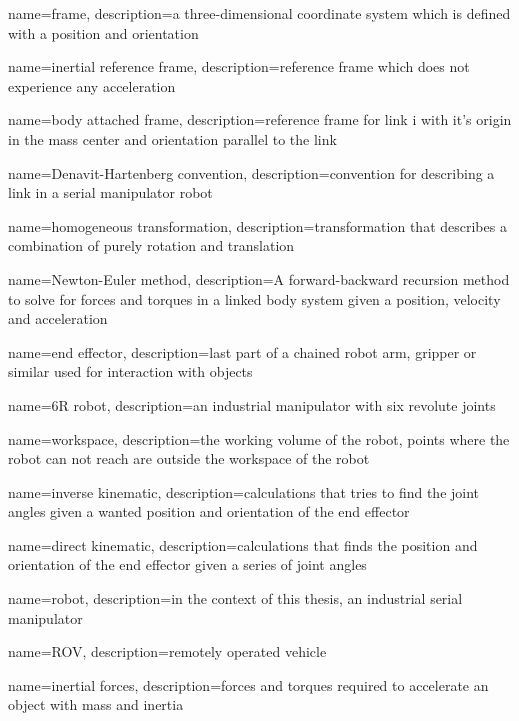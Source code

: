 \makeglossaries

{
    name={frame},
    description={a three-dimensional coordinate system which is defined with a position and orientation}
}

{
    name={inertial reference frame},
    description={reference frame which does not experience any acceleration}
}
 
 
{
    name={body attached frame},
    description={reference frame for link i with it's origin in the mass center and orientation parallel to the link}
}

{
    name={Denavit-Hartenberg convention},
    description={convention for describing a link in a serial manipulator robot}
}

{
    name={homogeneous transformation},
    description={transformation that describes a combination of purely rotation and translation}
}


{
    name={Newton-Euler method},
    description={A forward-backward recursion method to solve for forces and torques in a linked body system given a position, velocity and acceleration}
}

{
    name={end effector},
    description={last part of a chained robot arm, gripper or similar used for interaction with objects}
}

{
    name={6R robot},
    description={an industrial manipulator with six revolute joints}
}

{
    name={workspace},
    description={the working volume of the robot, points where the robot can not reach are outside the workspace of the robot}
}

{
    name={inverse kinematic},
    description={calculations that tries to find the joint angles given a wanted position and orientation of the end effector}
}


{
    name={direct kinematic},
    description={calculations that finds the position and orientation of the end effector given a series of joint angles}
}

{
    name={robot},
    description={in the context of this thesis, an industrial serial manipulator}
}

{
    name={ROV},
    description={remotely operated vehicle}
}

{
    name={inertial forces},
    description={forces and torques required to accelerate an object with mass and inertia}
}